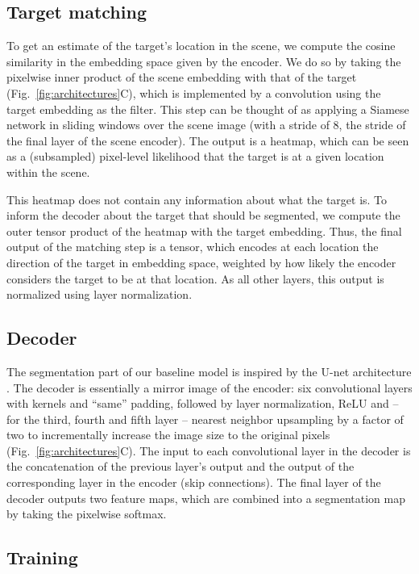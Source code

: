 \documentclass{article}
\begin{document}
\subsection{Target matching}

To get an estimate of the target's location in the scene, we compute the cosine similarity in the embedding space given by the encoder. We do so by taking the pixelwise inner product of the scene embedding with that of the target (Fig.~\ref{fig:architectures}C), which is implemented by a  convolution using the target embedding as the filter.
This step can be thought of as applying a Siamese network in sliding windows over the scene image (with a stride of 8, the stride of the final layer of the scene encoder). The output is a  heatmap, which can be seen as a (subsampled) pixel-level likelihood that the target is at a given location within the scene. 

This heatmap does not contain any information about what the target is. To inform the decoder about the target that should be segmented, we compute the outer tensor product of the heatmap with the target embedding. Thus, the final output of the matching step is a  tensor, which encodes at each location the direction of the target in embedding space, weighted by how likely the encoder considers the target to be at that location. As all other layers, this output is normalized using layer normalization.



\subsection{Decoder}

The segmentation part of our baseline model is inspired by the U-net architecture \cite{Ronneberger2015a}. The decoder is essentially a mirror image of the encoder: six convolutional layers with  kernels and ``same'' padding, followed by layer normalization, ReLU and -- for the third, fourth and fifth layer -- nearest neighbor upsampling by a factor of two to incrementally increase the image size to the original  pixels (Fig.~\ref{fig:architectures}C). The input to each convolutional layer in the decoder is the concatenation of the previous layer's output and the output of the corresponding layer in the encoder (skip connections). The final layer of the decoder outputs two feature maps, which are combined into a segmentation map by taking the pixelwise softmax.


\subsection{Training}
\label{sec:baseline/training}
\end{document}
